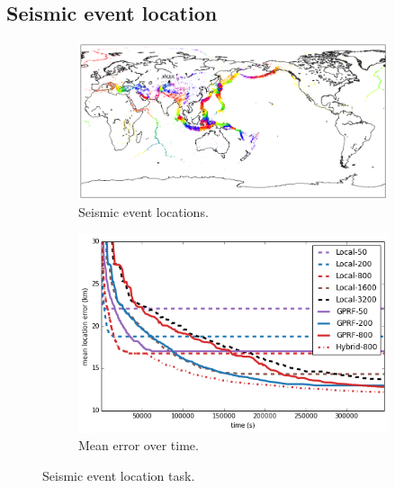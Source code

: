 \documentclass{article}
\begin{document}
\subsection{Seismic event location}
\vspace{-0.2cm}
 \begin{figure}
 \centering
  \begin{subfigure}[t]{.50\textwidth}
                  \includegraphics[width=\textwidth]{seismic_X}
                  \caption{Seismic event locations.}
                  \label{fig:seismicX}
          \end{subfigure}\hspace{0.5em}
  \begin{subfigure}[t]{.40\textwidth}
                  \includegraphics[width=\textwidth]{seismic_xcov_small}
                  \caption{Mean error over time.}
                  \label{fig:seismicresults}
          \end{subfigure}
 \caption{Seismic event location task.}
 \label{fig:seismic}
\vspace{-0.7cm}
 \end{figure}
\end{document}
